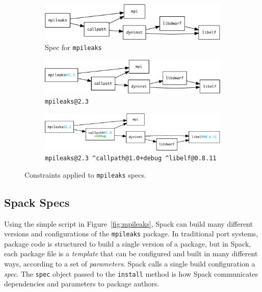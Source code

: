 
\begin{figure}
	\begin{subfigure}{\linewidth}
		\centering
		\includegraphics[width=\columnwidth]{specs/mpileaks.pdf}
		\caption{
			Spec for {\tt mpileaks}
			\label{fig:specs-mpileaks}
		}
	\end{subfigure}
%
	\begin{subfigure}{\linewidth}
		\centering
		\includegraphics[width=\columnwidth]{specs/mpileaks-version}
		\caption{
			{\tt mpileaks@2.3}
			\label{fig:specs-mpileaks-version}
		}
	\end{subfigure}
%
	\begin{subfigure}{\linewidth}
		\centering
		\includegraphics[width=\columnwidth]{specs/mpileaks-abstract.pdf}
		\caption{
			{\tt mpileaks@2.3 \^{}callpath@1.0+debug \^{}libelf@0.8.11}
			\label{fig:specs-mpileaks-abstract}
		}
	\end{subfigure}
%
	\caption{
		Constraints applied to {\tt mpileaks} specs.
	}
	\label{fig:specs}
\end{figure}



\subsection{Spack Specs}\label{sec:specs}

Using the simple script in Figure~\ref{fig:mpileaks}, Spack can build many different
versions and configurations of the {\tt mpileaks} package.  In traditional port systems,
package code is structured to build a single version of a package, but in Spack, each
package file is a {\it template} that can be configured and built in many
different ways, according to a set of {\it parameters}.
Spack calls a single build configuration a {\it spec}. The {\tt spec} object
passed to the {\tt install} method is how Spack communicates dependencies and parameters to package authors.

